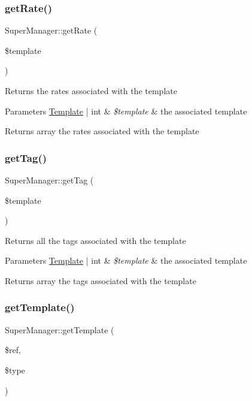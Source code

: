 \subsubsection{\texorpdfstring{get\+Rate()}{getRate()}}
{\footnotesize\ttfamily Super\+Manager\+::get\+Rate (\begin{DoxyParamCaption}\item[{}]{\$template }\end{DoxyParamCaption})}

Returns the rates associated with the template 
\begin{DoxyParams}[1]{Parameters}
\hyperlink{classTemplate}{Template} | int & {\em \$template} & the associated template \\
\hline
\end{DoxyParams}
\begin{DoxyReturn}{Returns}
array the rates associated with the template 
\end{DoxyReturn}
\mbox{\label{classSuperManager_a9d9e312e8f4f4c105b619c37cfe05908}} 
\subsubsection{\texorpdfstring{get\+Tag()}{getTag()}}
{\footnotesize\ttfamily Super\+Manager\+::get\+Tag (\begin{DoxyParamCaption}\item[{}]{\$template }\end{DoxyParamCaption})}

Returns all the tags associated with the template 
\begin{DoxyParams}[1]{Parameters}
\hyperlink{classTemplate}{Template} | int & {\em \$template} & the associated template \\
\hline
\end{DoxyParams}
\begin{DoxyReturn}{Returns}
array the tags associated with the template 
\end{DoxyReturn}
\mbox{\label{classSuperManager_a893c2c2ec7efa813fb38fcd6dfa4e91f}} 
\subsubsection{\texorpdfstring{get\+Template()}{getTemplate()}}
{\footnotesize\ttfamily Super\+Manager\+::get\+Template (\begin{DoxyParamCaption}\item[{}]{\$ref,  }\item[{}]{\$type }\end{DoxyParamCaption})}

